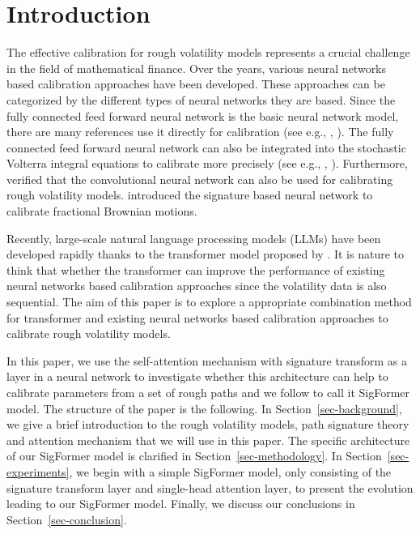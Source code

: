 \documentclass[]{article}
\renewcommand{\(}{\left(}
\renewcommand{\)}{\right)}
\begin{document}
	\section{Introduction}\label{sec-introduction}
	The effective calibration for rough volatility models represents a crucial challenge in the field of mathematical finance. Over the years, various neural networks based calibration approaches have been developed. These approaches can be categorized by the different types of neural networks they are based. Since the fully connected feed forward neural network is the basic neural network model, there are many references use it directly for calibration (see e.g., \cite{horvath2021deep}, \cite{rosenbaum2021deep}). The fully connected feed forward neural network can also be integrated into the stochastic Volterra integral equations to calibrate more precisely (see e.g., \cite{wang2021NSDE}, \cite{ma2023rough}). Furthermore, \cite{stone_2020} verified that the convolutional neural network can also be used for calibrating rough volatility models. \cite{Lyons_2019_DeepSignature} introduced the signature based neural network to calibrate fractional Brownian motions. 
	
	Recently, large-scale natural language processing models (LLMs) have been developed rapidly thanks to the transformer model proposed by \cite{vaswani_2017}. It is nature to think that whether the transformer can improve the performance of existing neural networks based calibration approaches since the volatility data is also sequential. The aim of this paper is to explore a appropriate combination method for transformer and existing neural networks based calibration approaches to calibrate rough volatility models.
	
	In this paper, we use the self-attention mechanism with signature transform as a layer in a neural network to investigate whether this architecture can help to calibrate parameters from a set of rough paths and we follow \cite{tong_2023} to call it SigFormer model. The structure of the paper is the following. In Section~\ref{sec-background}, we give a brief introduction to the rough volatility models, path signature theory and attention mechanism that we will use in this paper. The specific architecture of our SigFormer model is clarified in Section~\ref{sec-methodology}. In Section~\ref{sec-experiments}, we begin with a simple SigFormer model, only consisting of the signature transform layer and single-head attention layer, to present the evolution leading to our SigFormer model. Finally, we discuss our conclusions in Section~\ref{sec-conclusion}.
\end{document}
